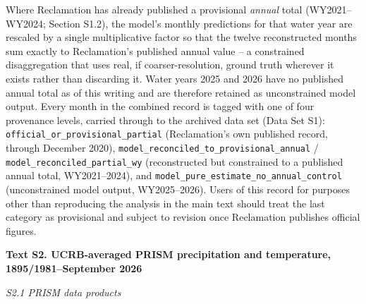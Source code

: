 \documentclass[draft,grl]{agutexSI2019}
\begin{document}
\begin{article}
Where Reclamation has already published a provisional \emph{annual} total (WY2021--WY2024; Section S1.2), the model's monthly predictions for that water year are rescaled by a single multiplicative factor so that the twelve reconstructed months sum exactly to Reclamation's published annual value -- a constrained disaggregation that uses real, if coarser-resolution, ground truth wherever it exists rather than discarding it. Water years 2025 and 2026 have no published annual total as of this writing and are therefore retained as unconstrained model output. Every month in the combined record is tagged with one of four provenance levels, carried through to the archived data set (Data Set S1): \texttt{official\_or\_provisional\_partial} (Reclamation's own published record, through December 2020), \texttt{model\_reconciled\_to\_provisional\_annual} / \texttt{model\_reconciled\_partial\_wy} (reconstructed but constrained to a published annual total, WY2021--2024), and \texttt{model\_pure\_estimate\_no\_annual\_control} (unconstrained model output, WY2025--2026). Users of this record for purposes other than reproducing the analysis in the main text should treat the last category as provisional and subject to revision once Reclamation publishes official figures.

\noindent\textbf{Text S2. UCRB-averaged PRISM precipitation and temperature, 1895/1981--September 2026}

\noindent\textit{S2.1 PRISM data products}


\end{article}
\end{document}
